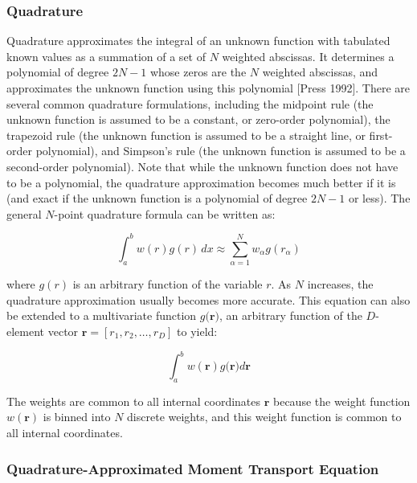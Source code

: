 \subsubsection{Quadrature}\label{subsubsec:quadrature}

Quadrature approximates the integral of an unknown function with tabulated known values as a summation of a set of $N$ weighted abscissas. It determines a polynomial of degree $2N-1$ whose zeros are the $N$ weighted abscissas, and approximates the unknown function using this polynomial [Press 1992]. There are several common quadrature formulations, including the midpoint rule (the unknown function is assumed to be a constant, or zero-order polynomial), the trapezoid rule (the unknown function is assumed to be a straight line, or first-order polynomial), and Simpson's rule (the unknown function is assumed to be a second-order polynomial). Note that while the unknown function does not have to be a polynomial, the quadrature approximation becomes much better if it is (and exact if the unknown function is a polynomial of degree $2N-1$ or less). The general $N$-point quadrature formula can be written as:

\begin{equation}\label{eq:quadrature-definition}
\int_{a}^{b}w(r)g(r)\, dx\approx{\displaystyle \sum_{\alpha=1}^{N}w_{\alpha}g(r_{\alpha})}
\end{equation}

\noindent where $g(r)$ is an arbitrary function of the variable $r$. As $N$ increases, the quadrature approximation usually becomes more accurate. This equation can also be extended to a multivariate function $g(\mathbf{r)}$, an arbitrary function of the $D$-element vector $\mathbf{r}=\left[r_{1},r_{2},\dots,r_{D}\right]$ to yield:

\begin{equation}\label{eq:multivariate-quadrature-definition}
{\displaystyle \int_{a}^{b}w(\mathbf{r})g(\mathbf{r)}d\mathbf{r}}
\end{equation}

The weights are common to all internal coordinates $\mathbf{r}$ because the weight function $w(\mathbf{r})$ is binned into $N$ discrete weights, and this weight function is common to all internal coordinates.



\subsubsection{Quadrature-Approximated Moment Transport Equation}\label{subsubsec:quadapproximated}

